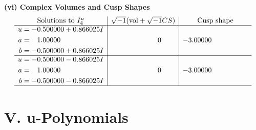 \documentclass[1p]{elsarticle_modified}
\theoremstyle{definition}
\newcommand{\I}{\sqrt{-1}}
\begin{document}
\newpage\flushleft \textbf{(vi) Complex Volumes and Cusp Shapes}
$$\begin{array}{c|c|c}  
\text{Solutions to }I^u_{4}& \I (\text{vol} + \sqrt{-1}CS) & \text{Cusp shape}\\
 \hline 
\begin{aligned}
u &= -0.500000 + 0.866025 I \\
a &= \phantom{-}1.00000\phantom{ +0.000000I} \\
b &= -0.500000 + 0.866025 I\end{aligned}
 & \phantom{-0.000000 } 0 & -3.00000\phantom{ +0.000000I} \\ \hline\begin{aligned}
u &= -0.500000 - 0.866025 I \\
a &= \phantom{-}1.00000\phantom{ +0.000000I} \\
b &= -0.500000 - 0.866025 I\end{aligned}
 & \phantom{-0.000000 } 0 & -3.00000\phantom{ +0.000000I}\\
 \hline 
 \end{array}$$\newpage
\newpage\renewcommand{\arraystretch}{1}
\centering \section*{ V. u-Polynomials}
\end{document}
